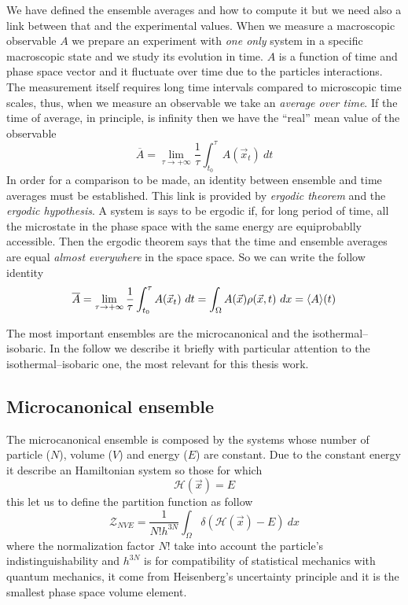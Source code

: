 We have defined the ensemble averages and how to compute it but we need also a link between that and the experimental values. When we measure a macroscopic observable $A$ we prepare an experiment with \textit{one only} system in a specific macroscopic state and we study its evolution in time. $A$ is a function of time and phase space vector and it fluctuate over time due to the particles interactions. The measurement itself requires long time intervals compared to microscopic time scales, thus, when we measure an observable we take an \textit{average over time}. If the time of average, in principle, is infinity then we have the ``real'' mean value of the observable
\begin{equation*}
	\overline{A} = \lim_{\tau\to +\infty}\frac{1}{\tau}\int_{t_0}^\tau A(\vec x_t)\ dt
	\label{eq:timeAve}
\end{equation*}
In order for a comparison to be made, an identity between ensemble and time averages must be established. This link is provided by \textit{ergodic theorem} and the \textit{ergodic hypothesis}. A system is says to be ergodic if, for long period of time, all the microstate in the phase space with the same energy are equiprobablly accessible. Then the ergodic theorem says that the time and ensemble averages are equal \textit{almost everywhere} in the space space. So we can write the follow identity
\begin{equation*}
	\overline{A} = \lim_{\tau\to +\infty}\frac{1}{\tau}\int_{t_0}^\tau A(\vec x_t)\ dt = \int_\Omega A(\vec x)\rho(\vec x, t)\ dx = \langle A \rangle(t)
\end{equation*}

The most important ensembles are the microcanonical and the isothermal--isobaric. In the follow we describe it briefly with particular attention to the isothermal--isobaric one, the most relevant for this thesis work.

\subsection{Microcanonical ensemble}
The microcanonical ensemble is composed by the systems whose number of particle ($N$), volume ($V$) and energy ($E$) are constant. Due to the constant energy it describe an Hamiltonian system so those for which
\begin{equation*}
	\mathcal{H}(\vec x) = E
\end{equation*}
this let us to define the partition function as follow
\begin{equation*}
	\mathcal{Z}_{NVE} = \frac{1}{N!h^{3N}}\int_\Omega \delta(\mathcal{H}(\vec x) - E)\ dx
\end{equation*}
where the normalization factor $N!$ take into account the particle's indistinguishability and $h^{3N}$ is for compatibility of statistical mechanics with quantum mechanics, it come from Heisenberg’s uncertainty principle and it is the smallest phase space volume element.

